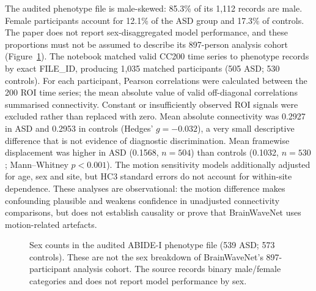 \documentclass[11pt,a4paper]{article}
\begin{document}
The audited phenotype file is male-skewed: 85.3\% of its 1,112 records are male. Female participants account for 12.1\% of the ASD group and 17.3\% of controls. The paper does not report sex-disaggregated model performance, and these proportions must not be assumed to describe its 897-person analysis cohort (Figure~\ref{fig:abide-sex}). The notebook matched valid CC200 time series to phenotype records by exact FILE\_ID, producing 1,035 matched participants (505 ASD; 530 controls). For each participant, Pearson correlations were calculated between the 200 ROI time series; the mean absolute value of valid off-diagonal correlations summarised connectivity. Constant or insufficiently observed ROI signals were excluded rather than replaced with zero. Mean absolute connectivity was 0.2927 in ASD and 0.2953 in controls (Hedges' $g=-0.032$), a very small descriptive difference that is not evidence of diagnostic discrimination. Mean framewise displacement was higher in ASD (0.1568, $n=504$) than controls (0.1032, $n=530$; Mann--Whitney $p<0.001$). The motion sensitivity models additionally adjusted for age, sex and site, but HC3 standard errors do not account for within-site dependence. These analyses are observational: the motion difference makes confounding plausible and weakens confidence in unadjusted connectivity comparisons, but does not establish causality or prove that BrainWaveNet uses motion-related artefacts.

\begin{figure}[H]
\centering
{}
\caption{Sex counts in the audited ABIDE-I phenotype file (539 ASD; 573 controls). These are not the sex breakdown of BrainWaveNet's 897-participant analysis cohort. The source records binary male/female categories and does not report model performance by sex.}
\label{fig:abide-sex}
\end{figure}
\end{document}
